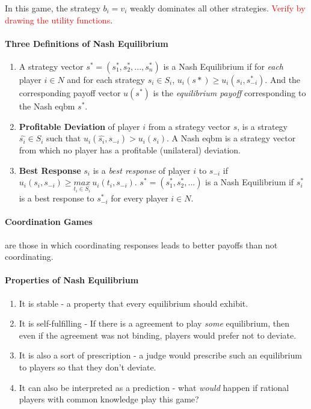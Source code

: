 In this game, the strategy $b_i = v_i$ weakly dominates all other strategies. \textcolor{red}{Verify by drawing the utility functions}.

\paragraph{Three Definitions of Nash Equilibrium} 
\begin{enumerate}
	\item A strategy vector $s^* = (s_1^*, s_2^*, ..., s_n^*)$ is a Nash Equilibrium if for \textit{each} player $i \in N$ and for each strategy $s_i \in S_i$, $u_i(s*) \geq u_i(s_i, s_{-i}^*)$. And the corresponding payoff vector $u(s^*)$ is the \textit{equilibrium payoff }corresponding to the Nash eqbm $s^*$.
	\item \textbf{Profitable Deviation} of player $i$ from a strategy vector $s$, is a strategy $\hat{s_i} \in S_i$ such that $u_i(\hat{s_i}, s_{-i}) > u_i(s_i)$. A Nash eqbm is a strategy vector from which no player has a profitable (unilateral) deviation.
	\item \textbf{Best Response} $s_i$ is a \textit{best response} of player $i$ to $s_{-i}$ if $u_i(s_i, s_{-i}) \geq \underset{t_i \in S_i}{max}~u_i(t_i, s_{-i})$. $s^* = (s_1^*, s_2^*, ...)$ is a Nash Equilibrium if $s_i^*$ is a best response to $s_{-i}^*$ for every player $i \in N$.
\end{enumerate}

\paragraph{Coordination Games} are those in which coordinating responses leads to better payoffs than not coordinating.

\paragraph{Properties of Nash Equilibrium}
\begin{enumerate}
	\item  It is stable - a property that every equilibrium should exhibit. 
	\item  It is self-fulfilling - If there is a agreement to play \textit{some} equilibrium, then even if the agreement was not binding, players would prefer not to deviate.
	\item It is also a sort of prescription - a judge would prescribe such an equilibrium to players so that they don't deviate. 
	\item  It can also be interpreted as a prediction - what \textit{would} happen if rational players with common knowledge play this game?
\end{enumerate}
